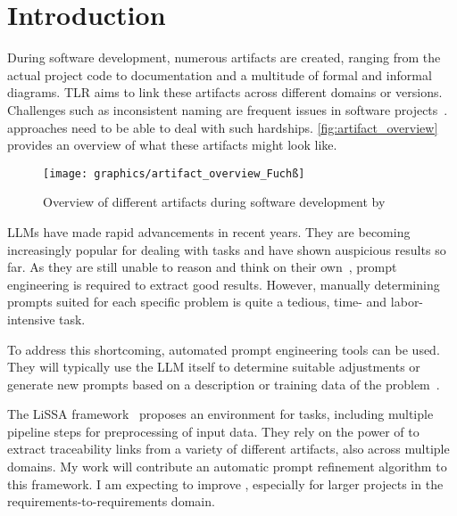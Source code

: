 
\chapter{Introduction}
\label{ch:Introduction}
During software development, numerous artifacts are created, ranging from the actual project code to documentation and a multitude of formal and informal diagrams. \Acl{TLR} aims to link these artifacts across different domains or versions.
Challenges such as inconsistent naming are frequent issues in software projects~\cite{wohlrab2019ImprovingConsistency}. \TLR approaches need to be able to deal with such hardships. \autoref{fig:artifact_overview} provides an overview of what these artifacts might look like.

\begin{figure}
    \centering
    \texttt{[image: graphics/artifact\_overview\_Fuchß]}
    \caption{Overview of different artifacts during software development by }
    \label{fig:artifact_overview}
\end{figure}

\Aclp{LLM} have made rapid advancements in recent years.
They are becoming increasingly popular for dealing with \TLR tasks and have shown auspicious results so far.
As they are still unable to reason and think on their own~\cite{shojaee2025IllusionThinking}, prompt engineering is required to extract good results.
However, manually determining prompts suited for each specific problem is quite a tedious, time- and labor-intensive task.

To address this shortcoming, automated prompt engineering tools can be used.
They will typically use the LLM itself to determine suitable adjustments or generate new prompts based on a description or training data of the problem~\cite{ramnath2025SystematicSurvey}.

The LiSSA framework~\cite{fuchss2025LiSSAGeneric} proposes an environment for \TLR tasks, including multiple pipeline steps for preprocessing of input data.
They rely on the power of \LLMs to extract traceability links from a variety of different artifacts, also across multiple domains.
My work will contribute an automatic prompt refinement algorithm to this framework.
I am expecting to improve \TLR, especially for larger projects in the requirements-to-requirements domain.
